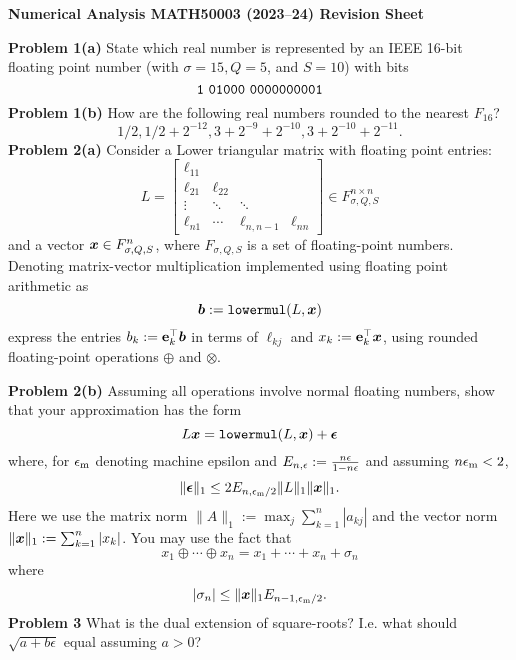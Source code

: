 \documentclass[12pt,a4paper]{article}
\def\endash{–}
\def\x{ {\vc x} }
\def\b{ {\vc b} }
\begin{document}
\textbf{Numerical Analysis MATH50003 (2023\ensuremath{\endash}24) Revision Sheet}

\textbf{Problem 1(a)} State which real number is represented by an IEEE 16-bit floating point number (with $\ensuremath{\sigma} = 15, Q = 5$, and $S = 10$) with bits
\[
{\tt 1\ 01000\ 0000000001}
\]
\textbf{Problem 1(b)}  How are the following real numbers rounded to the nearest $F_{16}$?
\[
1/2, 1/2 + 2^{-12}, 3 + 2^{-9} + 2^{-10}, 3 + 2^{-10} + 2^{-11}.
\]
\textbf{Problem 2(a)} Consider a Lower triangular matrix with floating point entries:
\[
L = \begin{bmatrix}
\ensuremath{\ell}_{11} \\
 \ensuremath{\ell}_{21} & \ensuremath{\ell}_{22} \\
 \ensuremath{\vdots} & \ensuremath{\ddots} & \ensuremath{\ddots} \\
 \ensuremath{\ell}_{n1} & \ensuremath{\cdots} & \ensuremath{\ell}_{n,n-1} & \ensuremath{\ell}_{nn}
 \end{bmatrix} \ensuremath{\in} F_{\ensuremath{\sigma},Q,S}^{n \ensuremath{\times} n}
\]
and a vector $\ensuremath{\bm{\x}} \in F_{\ensuremath{\sigma},Q,S}^{n}$, where $F_{\ensuremath{\sigma},Q,S}$ is a set of floating-point numbers. Denoting matrix-vector multiplication implemented using floating point arithmetic as
\[
\ensuremath{\bm{\b}} := {\tt lowermul}(L,\ensuremath{\bm{\x}})
\]
express the entries $b_k := {\bf e}_k^\ensuremath{\top} \ensuremath{\bm{\b}}$  in terms of $\ensuremath{\ell}_{kj}$ and $x_k := {\bf e}_k^\ensuremath{\top} \ensuremath{\bm{\x}}$, using rounded floating-point operations $\ensuremath{\oplus}$ and $\ensuremath{\otimes}$. 

\textbf{Problem 2(b)} Assuming all operations involve normal floating numbers, show that your approximation has the form
\[
L \ensuremath{\bm{\x}} = {\tt lowermul}(L, \ensuremath{\bm{\x}}) + \ensuremath{\bm{\epsilon}}
\]
where, for $\ensuremath{\epsilon}_{\rm m}$ denoting machine epsilon and $E_{n,\ensuremath{\epsilon}}:= {n \ensuremath{\epsilon} \over 1-n\ensuremath{\epsilon}}$ and assuming $n \ensuremath{\epsilon}_{\rm m} < 2$,
\[
\| \ensuremath{\bm{\epsilon}} \|_1 \ensuremath{\leq}   2E_{n,\ensuremath{\epsilon}_{\rm m}/2}   \|L\|_1 \| \ensuremath{\bm{\x}} \|_1.
\]
Here we use  the matrix norm $\| A \|_1 := \max_j \ensuremath{\sum}_{k=1}^n |a_{kj}|$ and the vector norm $\| \ensuremath{\bm{\x}} \|_1 := \ensuremath{\sum}_{k=1}^n |x_k|$. You may use the fact that
\[
x_1 \ensuremath{\oplus} \ensuremath{\cdots} \ensuremath{\oplus} x_n = x_1 +  \ensuremath{\cdots} + x_n + \ensuremath{\sigma}_n
\]
where
\[
|\ensuremath{\sigma}_n| \ensuremath{\leq} \| \ensuremath{\bm{\x}} \|_1 E_{n-1,\ensuremath{\epsilon}_{\rm m}/2}.
\]
\textbf{Problem 3} What is the dual extension of square-roots? I.e. what should $\sqrt{a + b \ensuremath{\epsilon}}$ equal assuming $a > 0$?
\end{document}
